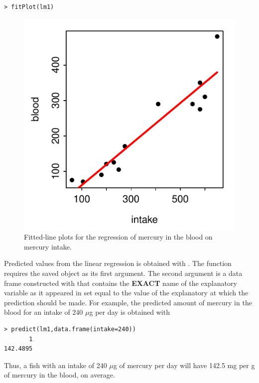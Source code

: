 \documentclass[10pt,openany]{book}\usepackage[]{graphicx}\usepackage[]{color}
\makeatletter
\newenvironment{kframe}{%
 \def\at@end@of@kframe{}%
 \ifinner\ifhmode%
  \def\at@end@of@kframe{\end{minipage}}%
  \begin{minipage}{\columnwidth}%
 \fi\fi%
 \def\FrameCommand##1{\hskip\@totalleftmargin \hskip-\fboxsep
 \colorbox{shadecolor}{##1}\hskip-\fboxsep
     \hskip-\linewidth \hskip-\@totalleftmargin \hskip\columnwidth}%
 \MakeFramed {\advance\hsize-\width
   \@totalleftmargin\z@ \linewidth\hsize
   \@setminipage}}%
 {\par\unskip\endMakeFramed%
 \at@end@of@kframe}
\newenvironment{knitrout}{}{} %
\makeatother
\begin{document}
\begin{knitrout}
\color{fgcolor}\begin{kframe}
\begin{verbatim}
> fitPlot(lm1)
\end{verbatim}
\end{kframe}\begin{figure}[hbtp]

{\centering \includegraphics[width=.4\linewidth]{Figs/HGFLP-1} 

}

\caption[Fitted-line plots for the regression of mercury in the blood on mercury intake]{Fitted-line plots for the regression of mercury in the blood on mercury intake.}\label{fig:HGFLP}
\end{figure}


\end{knitrout}

Predicted values from the linear regression is obtained with .  The  function requires the saved   object as its first argument.  The second argument is a data frame constructed with  that contains the \textbf{EXACT} name of the explanatory variable as it appeared in  set equal to the value of the explanatory at which the prediction should be made.  For example, the predicted amount of mercury in the blood for an intake of 240 $\mu$g per day is obtained with
\begin{knitrout}
\color{fgcolor}\begin{kframe}
\begin{verbatim}
> predict(lm1,data.frame(intake=240))
       1 
142.4895 
\end{verbatim}
\end{kframe}
\end{knitrout}
Thus, a fish with an intake of 240 $\mu$g of mercury per day will have 142.5 mg per g of mercury in the blood, on average.
\end{document}
